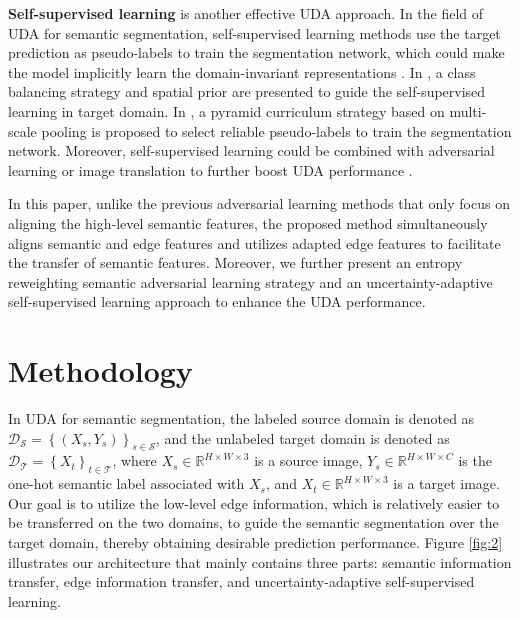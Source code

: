 \documentclass[sigconf]{acmart}
\begin{document}
\par \textbf{Self-supervised learning} is another effective UDA approach. In the field of UDA for semantic segmentation, self-supervised learning methods use the target prediction as pseudo-labels to train the segmentation network, which could make the model implicitly learn the domain-invariant representations \cite{zou2018unsupervised,yu2021dast}. In \cite{zou2018unsupervised}, a class balancing strategy and spatial prior are presented to guide the self-supervised learning in target domain. In \cite{lian2019constructing}, a pyramid curriculum strategy based on multi-scale pooling is proposed to select reliable pseudo-labels to train the segmentation network. Moreover, self-supervised learning could be combined with adversarial learning or image translation to further boost UDA performance \cite{yang2020fda,kim2020learning,pan2020unsupervised,yu2021dast}. 



\par In this paper, unlike the previous adversarial learning methods that only focus on aligning the high-level semantic features, the proposed method simultaneously aligns semantic and edge features and utilizes adapted edge features to facilitate the transfer of semantic features. Moreover, we further present an entropy reweighting semantic adversarial learning strategy and an uncertainty-adaptive self-supervised learning approach to enhance the UDA performance.








\section{Methodology}
\par In UDA for semantic segmentation, the labeled source domain is denoted as $\mathcal{D}_{\mathcal{S}}=\left\{\left(X_{s}, Y_{s}\right)\right\}_{s \in \mathcal{S}}$, and the unlabeled target domain is denoted as $\mathcal{D}_{\mathcal{T}}=\left\{X_{t}\right\}_{t \in \mathcal{T}}$, where $X_{s} \in \mathbb{R}^{H \times W \times 3}$ is a source image, $Y_{s} \in \mathbb{R}^{H \times W \times C}$ is the one-hot semantic label associated with $X_{s}$, and $X_{t} \in \mathbb{R}^{H \times W \times 3}$ is a target image. Our goal is to utilize the low-level edge information, which is relatively easier to be transferred on the two domains, to guide the semantic segmentation over the target domain, thereby obtaining desirable prediction performance. Figure \ref{fig:2} illustrates our architecture that mainly contains three parts: semantic information transfer, edge information transfer, and uncertainty-adaptive self-supervised learning.
\end{document}

